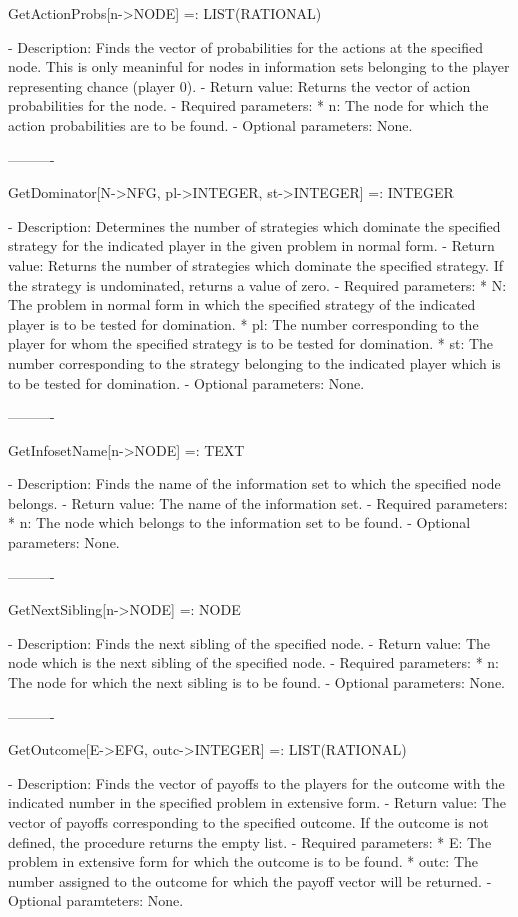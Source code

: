 {GetActionProbs[n->NODE] =: LIST(RATIONAL)

   -	Description:  Finds the vector of probabilities for the actions at the
	specified node.  This is only meaninful for nodes in information sets 
	belonging to the player representing chance (player 0).
   -	Return value:  Returns the vector of action probabilities for the node.
   -	Required parameters: 
	  *  n:  The node for which the action probabilities are to be found.
   -	Optional parameters:  None.

----------

GetDominator[N->NFG, pl->INTEGER, st->INTEGER] =: INTEGER

   -	Description:  Determines the number of strategies which dominate the
	specified strategy for the indicated player in the given problem in 
	normal form.
   -	Return value:  Returns the number of strategies which dominate the
	specified strategy.  If the strategy is undominated, returns a value of
	zero.  
   -	Required parameters:
	  *  N:  The problem in normal form in which the specified strategy of
		the indicated player is to be tested for domination.
	  *  pl:  The number corresponding to the player for whom the specified
		strategy is to be tested for domination.
	  *  st:  The number corresponding to the strategy belonging to the 
		indicated player which is to be tested for domination.
   -	Optional parameters:  None.

----------

GetInfosetName[n->NODE] =: TEXT

   -	Description:  Finds the name of the information set to which the 
	specified node belongs.
   -	Return value:  The name of the information set.
   -	Required parameters:
	  *  n:  The node which belongs to the information set to be found.
   -	Optional parameters:  None.

----------

GetNextSibling[n->NODE] =: NODE

   -	Description:  Finds the next sibling of the specified node.
   -	Return value:  The node which is the next sibling of the specified 
	node.
   -	Required parameters:
	  *  n:  The node for which the next sibling is to be found.
   -	Optional parameters:  None.

----------

GetOutcome[E->EFG, outc->INTEGER] =: LIST(RATIONAL)

   -	Description:  Finds the vector of payoffs to the players for the 
	outcome with the indicated number in the specified problem in extensive
	form.
   -	Return value:  The vector of payoffs corresponding to the specified 
	outcome.  If the outcome is not defined, the procedure returns the 
	empty list.
   -	Required parameters:
	  *  E:  The problem in extensive form for which the outcome is to be
		found.
	  *  outc:  The number assigned to the outcome for which the payoff 
		vector will be returned.
   -	Optional paramteters:  None.

}
